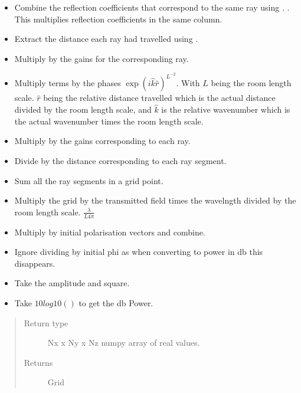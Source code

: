 \documentclass[letterpaper,10pt,english]{sphinxmanual}
\begin{document}
\begin{fulllineitems}
\begin{itemize}
\item {} 
Combine the reflection coefficients that correspond to the same     ray using {\hyperref[\detokenize{index:DictionarySparseMatrix.DS}]{}}. . This     multiplies reflection coefficients in the same column.

\item {} 
Extract the distance each ray had travelled using     {\hyperref[\detokenize{index:DictionarySparseMatrix.DS}]{}}. 

\item {} 
Multiply by the gains for the corresponding ray.

\item {} 
Multiply terms by the phases     \(\exp(i\hat{k} \hat{r})^{L^{-2}}\). With \(L\) being     the room length scale. \(\hat{r}\) being the relative distance     travelled which is the actual distance divided by the room length     scale, and \(\hat{k}\) is the relative wavenumber which is the     actual wavenumber times the room length scale.

\item {} 
Multiply by the gains corresponding to each ray.

\item {} 
Divide by the distance corresponding to each ray segment.

\item {} 
Sum all the ray segments in a grid point.

\item {} 
Multiply the grid by the transmitted field times the wavelngth     divided by the room length scale. \(\frac{\lambda}{L 4 \pi}\)

\item {} 
Multiply by initial polarisation vectors and combine.

\item {} 
Ignore dividing by initial phi as when converting to power in db     this disappears.

\item {} 
Take the amplitude and square.

\item {} 
Take \(10log10()\) to get the db Power.

\end{itemize}
\begin{quote}\begin{description}
\item[{Return type}] \leavevmode
Nx x Ny x Nz numpy array of real values.

\item[{Returns}] \leavevmode
Grid

\end{description}\end{quote}

\end{fulllineitems}
\end{document}
